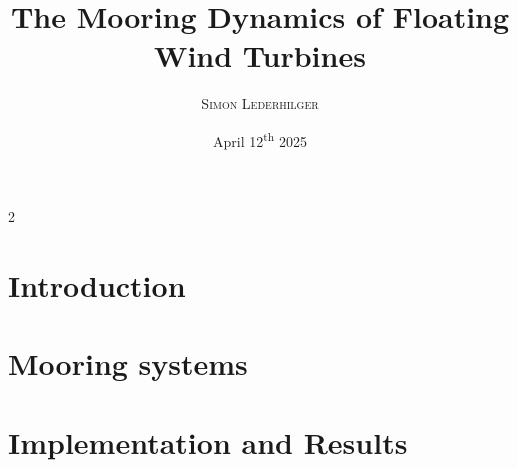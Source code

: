 \documentclass{article}
\title{The Mooring Dynamics of Floating Wind Turbines}
\subtitle{\emph{\headcourse}}
\author{\textsc{Simon Lederhilger}}
\date{April 12\textsuperscript{th} 2025}
\begin{document}
\maketitle\thispagestyle{fancy}
\begin{multicols*}{2}
  \section[Introduction]{Introduction}
  \begingroup\endgroup
  
  \section[Mooring]{Mooring systems}
  \begingroup\endgroup

  \section[Results]{Implementation and Results}
  \begingroup\endgroup
  \printbibliography
\end{multicols*}
\end{document}
